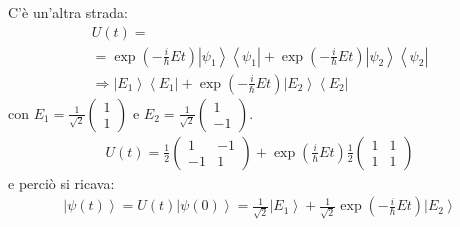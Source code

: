 C'è un'altra strada:
\begin{equation}\begin{split}
U\left(t\right)=\\
=\exp{\left(-\frac{i}{\hbar }Et\right)}\left |\psi _1 \right\rangle\left\langle \psi _1\right |+\exp{\left(-\frac{i}{\hbar }Et\right)}\left |\psi _2 \right\rangle\left\langle \psi _2\right |\\
\Longrightarrow \left |E_1 \right\rangle\left\langle E_1\right |+\exp{\left(-\frac{i}{\hbar }Et\right)\left |E_2 \right\rangle\left\langle E_2\right |}
\end{split}\end{equation}
con $E_1=\frac{1}{\sqrt{2}}\left(\begin{matrix}1\\1\end{matrix}\right)$ e $E_2=\frac{1}{\sqrt{2}}\left(\begin{matrix}1\\-1\end{matrix}\right)$.
\begin{equation}\begin{split}
U\left(t\right)=\frac{1}{2}\left(\begin{matrix}1&-1\\-1&1\end{matrix}\right)+\exp{\left(\frac{i}{\hbar }Et\right)}\frac{1}{2}\left(\begin{matrix}1&1\\1&1\end{matrix}\right)
\end{split}\end{equation}
e perciò si ricava:
\begin{equation}\begin{split}
\left |\psi \left(t\right) \right\rangle=U\left(t\right)\left |\psi \left(0\right) \right\rangle=\frac{1}{\sqrt{2}}\left |E_1 \right\rangle+\frac{1}{\sqrt{2}}\exp{\left(-\frac{i}{\hbar }Et\right)}\left |E_2 \right\rangle
\end{split}\end{equation}

